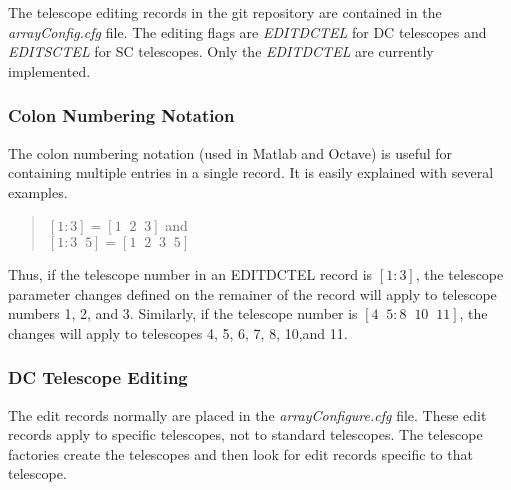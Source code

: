 \documentclass{article}
\begin{document}
The telescope editing records in the git repository are contained in the 
\emph{arrayConfig.cfg} file. The editing flags are \emph{EDITDCTEL} for
DC telescopes and  \emph{EDITSCTEL} for SC telescopes. Only the \emph{EDITDCTEL}
are currently implemented.

\subsubsection{Colon Numbering Notation}
The colon numbering notation (used in Matlab and Octave) is useful for containing
multiple entries in a single record. It is easily explained with several
examples. \\

\noindent
\begin{quote}
$[1 : 3] = [1\;\; 2\;\; 3]$  and  \\ 
$[1 : 3 \; \; 5] = [1 \;\; 2 \;\; 3 \;\; 5]$  \\ 
\end{quote}
Thus, if the telescope number in an EDITDCTEL record is $[1 :  3]$, the telescope parameter changes
defined on the remainer of the record will apply to telescope numbers 1, 2, and 3. Similarly, if the 
telescope number is $[4\;\;5:8\;\;10\;\;11]$, the changes will apply to telescopes 4, 5, 6, 7, 8, 10,and 11.

\subsubsection{DC Telescope Editing}

The edit records normally are placed in the \emph{arrayConfigure.cfg} 
file. These edit records apply 
to specific telescopes, not to standard telescopes.
The telescope factories create the telescopes and then look for edit records
specific to that telescope. 
\end{document}
